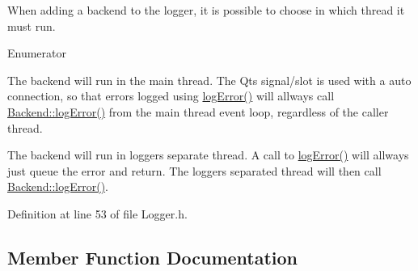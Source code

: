 When adding a backend to the logger, it is possible to choose in which thread it must run. \begin{Desc}
\item[Enumerator]\par
\begin{description}
\item[{\em 
Execute\+In\+Main\+Thread\hypertarget{class_mdt_1_1_error_logger_1_1_logger_ab6d6198b43b2bb94cede114ec67b781caac54433e68e1f766627c9fcc87f7b818}{}\label{class_mdt_1_1_error_logger_1_1_logger_ab6d6198b43b2bb94cede114ec67b781caac54433e68e1f766627c9fcc87f7b818}
}]The backend will run in the main thread. The Qt\textquotesingle{}s signal/slot is used with a auto connection, so that errors logged using \hyperlink{class_mdt_1_1_error_logger_1_1_logger_aa06a24a1d521258729ca172465b02040}{log\+Error()} will allways call \hyperlink{class_mdt_1_1_error_logger_1_1_backend_acf37cfc576269934ca8ce04e3601058d}{Backend\+::log\+Error()} from the main thread event loop, regardless of the caller thread. \item[{\em 
Execute\+In\+Separate\+Thread\hypertarget{class_mdt_1_1_error_logger_1_1_logger_ab6d6198b43b2bb94cede114ec67b781caf7dfdc36418cac0a65cea2cde2a11fd7}{}\label{class_mdt_1_1_error_logger_1_1_logger_ab6d6198b43b2bb94cede114ec67b781caf7dfdc36418cac0a65cea2cde2a11fd7}
}]The backend will run in logger\textquotesingle{}s separate thread. A call to \hyperlink{class_mdt_1_1_error_logger_1_1_logger_aa06a24a1d521258729ca172465b02040}{log\+Error()} will allways just queue the error and return. The logger\textquotesingle{}s separated thread will then call \hyperlink{class_mdt_1_1_error_logger_1_1_backend_acf37cfc576269934ca8ce04e3601058d}{Backend\+::log\+Error()}. \end{description}
\end{Desc}


Definition at line 53 of file Logger.\+h.



\subsection{Member Function Documentation}
